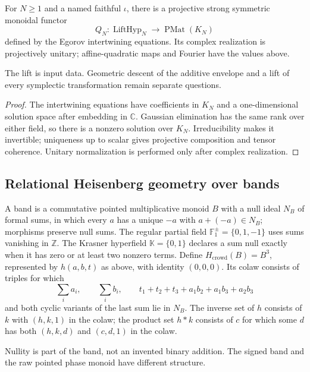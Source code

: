 \begin{proposition}
{\normalfont\statusSketch}\quad For $N\geq1$ and a named faithful $\iota$,
there is a projective strong symmetric monoidal functor
\[
Q_N:\operatorname{LiftHyp}_N\longrightarrow\operatorname{PMat}(K_N)
\]
defined by the Egorov intertwining equations. Its complex realization is
projectively unitary; affine-quadratic maps and Fourier have the values above.
\end{proposition}
\begin{scope}The lift is input data. Geometric descent of the additive
envelope and a lift of every symplectic transformation remain separate questions.\end{scope}
\begin{proof}
The intertwining equations have coefficients in $K_N$ and a one-dimensional
solution space after embedding in $\mathbb C$. Gaussian elimination has
the same rank over either field, so there is a nonzero solution over
$K_N$. Irreducibility makes it invertible; uniqueness up to scalar gives
projective composition and tensor coherence. Unitary normalization is
performed only after complex realization.
\end{proof}

\subsection{Relational Heisenberg geometry over bands}

\begin{definition}
A band is a commutative pointed multiplicative monoid $B$ with a null
ideal $N_B$ of formal sums, in which every $a$ has a unique $-a$ with
$a+(-a)\in N_B$; morphisms preserve null sums. The regular partial field
$\mathbb F_1^\pm=\{0,1,-1\}$ uses sums vanishing in $\mathbb Z$.
The Krasner hyperfield $\mathbb K=\{0,1\}$ declares a sum null exactly
when it has zero or at least two nonzero terms.
Define $H_{\mathrm{crowd}}(B)=B^3$, represented by $h(a,b,t)$ as above,
with identity $(0,0,0)$. Its colaw consists of triples for which
\[
\sum_i a_i,\qquad \sum_i b_i,\qquad
t_1+t_2+t_3+a_1b_2+a_1b_3+a_2b_3
\]
and both cyclic variants of the last sum lie in $N_B$.
The inverse set of $h$ consists of $k$ with $(h,k,1)$ in the colaw;
the product set $h*k$ consists of $c$ for which some $d$ has both
$(h,k,d)$ and $(c,d,1)$ in the colaw.
\end{definition}
\begin{scope}Nullity is part of the band, not an invented binary addition.
The signed band and the raw pointed phase monoid have different structure.\end{scope}


